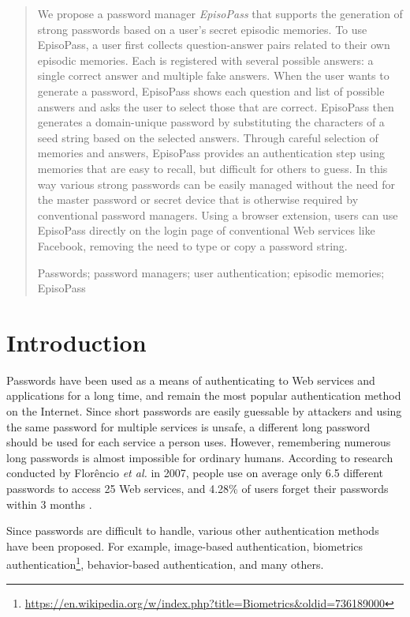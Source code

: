 \documentclass[runningheads,a4paper]{llncs}
\newcommand{\keywords}[1]{\par\addvspace\baselineskip
\noindent\keywordname\enspace\ignorespaces#1}
\begin{document}
\begin{abstract}
We propose a password manager \textit{EpisoPass} that supports the
generation of strong passwords based on a user's secret episodic
memories. To use EpisoPass, a user first collects question-answer
pairs related to their own episodic memories. Each is registered with
several possible answers: a single correct answer and multiple fake
answers. When the user wants to generate a password, EpisoPass shows
each question and list of possible answers and asks the user to select
those that are correct. EpisoPass then generates a domain-unique
password by substituting the characters of a seed string based on the
selected answers. Through careful selection of memories and answers,
EpisoPass provides an authentication step using memories that are easy
to recall, but difficult for others to guess. In this way various
strong passwords can be easily managed without the need for the master
password or secret device that is otherwise required by conventional
password managers. Using a browser extension, users can use EpisoPass
directly on the login page of conventional Web services like Facebook,
removing the need to type or copy a password string.

\keywords{Passwords; password managers; user authentication; episodic memories; EpisoPass}
\end{abstract}

\section{Introduction}

Passwords have been used as a means of authenticating to Web services
and applications for a long time, and remain the most popular
authentication method on the Internet.
%
Since short passwords are easily guessable by attackers and using the
same password for multiple services is unsafe, a different long
password should be used for each service a person uses.  However,
remembering numerous long passwords is almost impossible for ordinary
humans.
%
According to research conducted by Flor\^{e}ncio {\it et al.\/} in 2007,
people use on average only 6.5 different passwords to access 25 Web services, and
4.28\% of users forget their passwords within 3 months \cite{Florencio:2007:LSW:1242572.1242661}.

Since passwords are difficult to handle, various other authentication methods have been proposed.
For example, image-based authentication\cite{Biddle:2012:GPL:2333112.2333114,GraphicalPasswords},
biometrics authentication\footnote{
  \url{https://en.wikipedia.org/w/index.php?title=Biometrics&oldid=736189000}
},
behavior-based authentication\cite{Dandapat:2015:AYD:2702123.2702457}, and many others.
\end{document}
